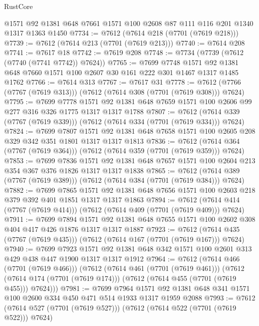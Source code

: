 \begin{lexlean}{RustCore}
\begin{coremodule}
    @1571
    @92
    @1381
    @648
    @7661
    @1571
    @100
    @2608
    @87
    @111
    @116
    @201
    @1340
    @1317
    @1363
    @1450
@7734 := @7612 (@7614 @218 (@7701 (@7619 @218)))
@7739 := @7612 (@7614 @213 (@7701 (@7619 @213)))
@7740 := @7614 @208
@7741 := @7617 @18
@7742 := @7619 @208
@7748 := @7734 (@7739 (@7612 (@7740 (@7741 @7742)) @7624))
@7765 := @7699
    @7748
    @1571
    @92
    @1381
    @648
    @7660
    @1571
    @100
    @2607
    @30
    @161
    @222
    @301
    @1467
    @1317
    @1485
    @1762
@7766 := @7614 @313
@7767 := @7617 @31
@7778 := @7612 (@7766 (@7767 (@7619 @313))) (@7612 (@7614 @308 (@7701 (@7619 @308))) @7624)
@7795 := @7699
    @7778
    @1571
    @92
    @1381
    @648
    @7659
    @1571
    @100
    @2606
    @99
    @277
    @316
    @326
    @1775
    @1317
    @1317
    @1788
@7807 := @7612 (@7614 @339 (@7767 (@7619 @339))) (@7612 (@7614 @334 (@7701 (@7619 @334))) @7624)
@7824 := @7699
    @7807
    @1571
    @92
    @1381
    @648
    @7658
    @1571
    @100
    @2605
    @208
    @329
    @342
    @351
    @1801
    @1317
    @1317
    @1813
@7836 := @7612 (@7614 @364 (@7767 (@7619 @364))) (@7612 (@7614 @359 (@7701 (@7619 @359))) @7624)
@7853 := @7699
    @7836
    @1571
    @92
    @1381
    @648
    @7657
    @1571
    @100
    @2604
    @213
    @354
    @367
    @376
    @1826
    @1317
    @1317
    @1838
@7865 := @7612 (@7614 @389 (@7767 (@7619 @389))) (@7612 (@7614 @384 (@7701 (@7619 @384))) @7624)
@7882 := @7699
    @7865
    @1571
    @92
    @1381
    @648
    @7656
    @1571
    @100
    @2603
    @218
    @379
    @392
    @401
    @1851
    @1317
    @1317
    @1863
@7894 := @7612 (@7614 @414 (@7767 (@7619 @414))) (@7612 (@7614 @409 (@7701 (@7619 @409))) @7624)
@7911 := @7699
    @7894
    @1571
    @92
    @1381
    @648
    @7655
    @1571
    @100
    @2602
    @308
    @404
    @417
    @426
    @1876
    @1317
    @1317
    @1887
@7923 := @7612 (@7614 @435 (@7767 (@7619 @435))) (@7612 (@7614 @167 (@7701 (@7619 @167))) @7624)
@7940 := @7699
    @7923
    @1571
    @92
    @1381
    @648
    @342
    @1571
    @100
    @2601
    @313
    @429
    @438
    @447
    @1900
    @1317
    @1317
    @1912
@7964 := @7612
    (@7614 @466 (@7701 (@7619 @466)))
    (@7612
      (@7614 @461 (@7701 (@7619 @461)))
      (@7612 (@7614 @174 (@7701 (@7619 @174))) (@7612 (@7614 @455 (@7701 (@7619 @455))) @7624)))
@7981 := @7699
    @7964
    @1571
    @92
    @1381
    @648
    @341
    @1571
    @100
    @2600
    @334
    @450
    @471
    @514
    @1933
    @1317
    @1959
    @2088
@7993 := @7612 (@7614 @527 (@7701 (@7619 @527))) (@7612 (@7614 @522 (@7701 (@7619 @522))) @7624)

\end{coremodule}
\end{lexlean}
